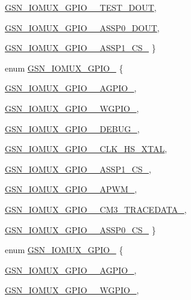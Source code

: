\begin{DoxyCompactItemize}
\par
\hyperlink{a00519_afa6173189136b639c78c6019bc59d4aca7869e4773e0487fa47b401ea63c21b19}{GSN\_\-IOMUX\_\-GPIO\_\_\-TEST\_\-DOUT}, 
\par
\hyperlink{a00519_afa6173189136b639c78c6019bc59d4aca631793f81c72e112118a3d3b766c06fa}{GSN\_\-IOMUX\_\-GPIO\_\_\-ASSP0\_\-DOUT}, 
\par
\hyperlink{a00519_afa6173189136b639c78c6019bc59d4aca8ce4fbdf99a60a02e8095354d16aa193}{GSN\_\-IOMUX\_\-GPIO\_\_\-ASSP1\_\-CS\_}
 \}
\item 
enum \hyperlink{a00519_a5fa705c1a76dfb74659f90fcdc65b0e1}{GSN\_\-IOMUX\_\-GPIO\_} \{ \par
\hyperlink{a00519_a5fa705c1a76dfb74659f90fcdc65b0e1afdfb5a7f1706fa0c7ec5637af4fba775}{GSN\_\-IOMUX\_\-GPIO\_\_\-AGPIO\_}, 
\par
\hyperlink{a00519_a5fa705c1a76dfb74659f90fcdc65b0e1a8b071c69f650825be2ca1626e743388c}{GSN\_\-IOMUX\_\-GPIO\_\_\-WGPIO\_}, 
\par
\hyperlink{a00519_a5fa705c1a76dfb74659f90fcdc65b0e1af651d6a0cc851665c1eb72708564dfb8}{GSN\_\-IOMUX\_\-GPIO\_\_\-DEBUG\_}, 
\par
\hyperlink{a00519_a5fa705c1a76dfb74659f90fcdc65b0e1a90e724bd3d696217c7a307cc2b66f8f9}{GSN\_\-IOMUX\_\-GPIO\_\_\-CLK\_\-HS\_\-XTAL}, 
\par
\hyperlink{a00519_a5fa705c1a76dfb74659f90fcdc65b0e1a877737e9dac4a05c230f30a1cb11128a}{GSN\_\-IOMUX\_\-GPIO\_\_\-ASSP1\_\-CS\_}, 
\par
\hyperlink{a00519_a5fa705c1a76dfb74659f90fcdc65b0e1a8de6ba379486b826219d0e597bf11f77}{GSN\_\-IOMUX\_\-GPIO\_\_\-APWM\_}, 
\par
\hyperlink{a00519_a5fa705c1a76dfb74659f90fcdc65b0e1a54d03cc692c7b6bdab8eefdeb5d1d040}{GSN\_\-IOMUX\_\-GPIO\_\_\-CM3\_\-TRACEDATA\_}, 
\par
\hyperlink{a00519_a5fa705c1a76dfb74659f90fcdc65b0e1a5fc5ec66e83ccb106a905c4f1fb9038f}{GSN\_\-IOMUX\_\-GPIO\_\_\-ASSP0\_\-CS\_}
 \}
\item 
enum \hyperlink{a00519_a46836e1fee802d5f2be675a93327d2f0}{GSN\_\-IOMUX\_\-GPIO\_} \{ \par
\hyperlink{a00519_a46836e1fee802d5f2be675a93327d2f0a7e654ec89e470ecd17e65fb2fbfc5043}{GSN\_\-IOMUX\_\-GPIO\_\_\-AGPIO\_}, 
\par
\hyperlink{a00519_a46836e1fee802d5f2be675a93327d2f0a0f19b43c5429b6e04db83edb7b087492}{GSN\_\-IOMUX\_\-GPIO\_\_\-WGPIO\_}, 
\par

\end{DoxyCompactItemize}
